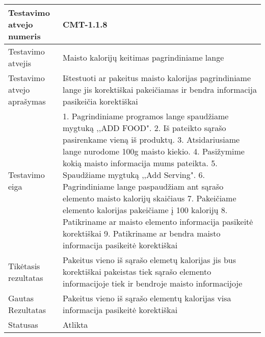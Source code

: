 \documentclass[oneside]{VUMIFPSkursinis}
\begin{document}
\begin{center}
    \begin{tabular}{ |p{5cm}|p{13cm}|}
    \hline
        Testavimo atvejo numeris & CMT-1.1.8  \\ \hline
        Testavimo atvejis & Maisto kalorijų keitimas pagrindiniame lange \\ \hline
        Testavimo atvejo aprašymas & Ištestuoti ar pakeitus maisto kalorijas pagrindiniame lange jis korektiškai pakeičiamas ir bendra informacija pasikeičia korektiškai \\ \hline
        Testavimo eiga &  1. Pagrindiniame programos lange spaudžiame mygtuką ,,ADD FOOD". 
				2. Iš pateikto sąrašo pasirenkame vieną iš produktų. 
				3. Atsidariusiame lange nurodome 100g maisto kiekio.
				4. Pasižymime kokią maisto informacija mums pateikta. 
				5. Spaudžiame mygtuką ,,Add Serving".
				6. Pagrindiniame lange paspaudžiam ant sąrašo elemento maisto kalorijų skaičiaus
				7. Pakeičiame elemento kalorijas pakeičiame į 100 kalorijų
				8. Patikriname ar maisto elemento informacija pasikeitė korektiškai
				9. Patikriname ar bendra maisto informacija pasikeitė korektiškai\\ \hline
        Tikėtasis rezultatas &  Pakeitus vieno iš sąrašo elemetų kalorijas jis bus korektiškai pakeistas tiek sąrašo elemento informacijoje tiek ir bendroje maisto informacijoje \\ \hline
        Gautas Rezultatas & Pakeitus vieno iš sąrašo elementų kalorijas visa informacija pasikeitė korektiškai \\ \hline
        Statusas &  Atlikta\\ \hline
    \hline
    \end{tabular}
\end{center}

\iffalse XXXXXXXXXXXXXXXXXXXXXXXXXXXXXXXXXXXXXXXXXXXXXXXXXXXXXXXXXXXXXXXXXXXXXXXXXXXXXXXXXXXXXXXXXXXXXXXXXXXXXXXXXXXXXXXXXXXXXXXXXXXXXXXXXXXXXXX \fi
\end{document}
